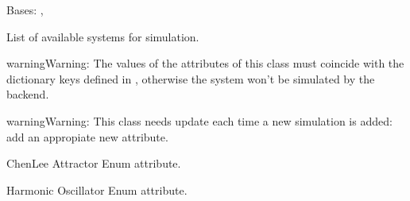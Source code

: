 \documentclass[a4paper,landscape,10pt,english]{sphinxmanual}
\begin{document}
\begin{fulllineitems}
\label{\detokenize{code_docs/simulation_API.controller:simulation_API.controller.schemas.SimSystem}}
Bases: , 

List of available systems for simulation.

\begin{sphinxadmonition}{warning}{Warning:}
The values of the attributes of this class must coincide with the
dictionary keys defined in
{\hyperref[\detokenize{code_docs/simulation_API.simulation:simulation_API.simulation.simulations.Simulations}]{}}, otherwise the
system won’t be simulated by the backend.
\end{sphinxadmonition}

\begin{sphinxadmonition}{warning}{Warning:}
This class needs update each time a new simulation is added: add an
appropiate new attribute.
\end{sphinxadmonition}

\begin{fulllineitems}
\label{\detokenize{code_docs/simulation_API.controller:simulation_API.controller.schemas.SimSystem.ChenLee}}
Chen\sphinxhyphen{}Lee Attractor Enum attribute.

\end{fulllineitems}


\begin{fulllineitems}
\label{\detokenize{code_docs/simulation_API.controller:simulation_API.controller.schemas.SimSystem.HO}}
Harmonic Oscillator Enum attribute.

\end{fulllineitems}


\end{fulllineitems}
\end{document}
